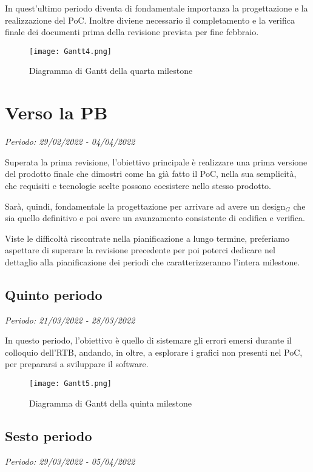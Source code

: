 In quest'ultimo periodo diventa di fondamentale importanza la progettazione e la realizzazione
 del PoC. Inoltre diviene necessario il completamento e la verifica finale dei documenti prima della revisione prevista
 per fine febbraio.


\begin{figure}[!ht]
    \texttt{[image: Gantt4.png]}
    \caption{Diagramma di Gantt della quarta milestone}
\end{figure}

\section{Verso la PB}

\textit{Periodo: 29/02/2022 - 04/04/2022}

Superata la prima revisione, l'obiettivo principale è realizzare una prima versione del prodotto finale che dimostri come ha già fatto il PoC, nella sua semplicità,
che requisiti e tecnologie scelte possono coesistere nello stesso prodotto.

Sarà, quindi, fondamentale la progettazione per arrivare ad avere un design$_G$ che sia quello definitivo e poi avere un avanzamento consistente di codifica e verifica.

Viste le difficoltà riscontrate nella pianificazione a lungo termine, preferiamo aspettare di superare la revisione precedente per poi poterci dedicare nel dettaglio
alla pianificazione dei periodi che caratterizzeranno l'intera milestone.

\subsection{Quinto periodo}
\textit{Periodo: 21/03/2022 - 28/03/2022}

In questo periodo, l'obiettivo è quello di sistemare gli errori emersi durante il colloquio dell'RTB, andando, in oltre, a esplorare i grafici non presenti nel PoC, per prepararsi a sviluppare il software.

\begin{figure}[!ht]
    \texttt{[image: Gantt5.png]}
    \caption{Diagramma di Gantt della quinta milestone}
\end{figure}

\subsection{Sesto periodo}
\textit{Periodo: 29/03/2022 - 05/04/2022}

